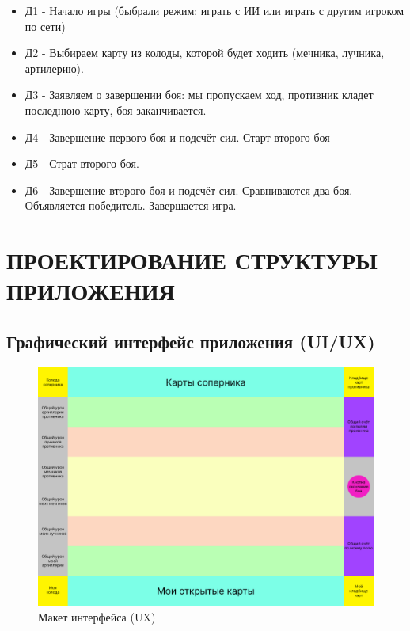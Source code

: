 \documentclass[12pt, a4paper, simple]{eskdtext}
\begin{document}
    \begin{itemize}
        \item Д1 - Начало игры (быбрали режим: играть с ИИ или играть с другим игроком по сети)
        \item Д2 - Выбираем карту из колоды, которой будет ходить (мечника, лучника, артилерию).
        \item Д3 - Заявляем о завершении боя: мы пропускаем ход, противник кладет последнюю карту, боя заканчивается.
        \item Д4 - Завершение первого боя и подсчёт сил. Старт второго боя
        \item Д5 - Страт второго боя.
        \item Д6 - Завершение второго боя и подсчёт сил. Сравниваются два боя. Объявляется победитель. Завершается игра.
    \end{itemize}

    \newpage
    \section{ПРОЕКТИРОВАНИЕ СТРУКТУРЫ ПРИЛОЖЕНИЯ}

    
    \subsection{Графический интерфейс приложения (UI/UX)}
    
    \begin{figure}[!h]
        \centering
        \includegraphics[width=12cm]
            {../sources/game_ux/build/game_ux.png}
        \caption{Макет интерфейса (UX)}
    \end{figure}
\end{document}
